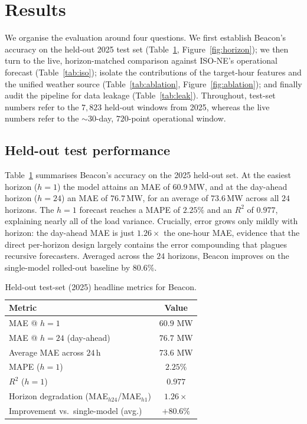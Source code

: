 \section{Results}\label{sec:results}

We organise the evaluation around four questions. We first
establish Beacon's accuracy on the held-out 2025 test set
(Table~\ref{tab:headline}, Figure~\ref{fig:horizon}); we then turn to the live,
horizon-matched comparison against ISO-NE's operational forecast
(Table~\ref{tab:iso}); isolate the contributions of the target-hour features and
the unified weather source (Table~\ref{tab:ablation}, Figure~\ref{fig:ablation});
and finally audit the pipeline for data leakage (Table~\ref{tab:leak}). Throughout,
test-set numbers refer to the $7{,}823$ held-out windows from 2025, whereas the
live numbers refer to the $\sim$30-day, $720$-point operational window.

\subsection{Held-out test performance}
Table~\ref{tab:headline} summarises Beacon's accuracy on the 2025 held-out set.
At the easiest horizon ($h=1$) the model attains an MAE of $60.9$\,MW, and at the
day-ahead horizon ($h=24$) an MAE of $76.7$\,MW, for an average of $73.6$\,MW
across all $24$ horizons. The $h=1$ forecast reaches a MAPE of $2.25\%$ and an
$R^2$ of $0.977$, explaining nearly all of the load variance. Crucially, error
grows only mildly with horizon: the day-ahead MAE is just $1.26\times$ the
one-hour MAE, evidence that the direct per-horizon design largely contains the
error compounding that plagues recursive forecasters. Averaged across the $24$
horizons, Beacon improves on the single-model rolled-out baseline by $80.6\%$.

\begin{table}[t]
\centering
\caption{Held-out test-set (2025) headline metrics for Beacon.}
\label{tab:headline}
\begin{tabular}{lc}
\toprule
Metric & Value \\
\midrule
MAE @ $h=1$ & $60.9$ MW \\
MAE @ $h=24$ (day-ahead) & $76.7$ MW \\
Average MAE across $24$\,h & $73.6$ MW \\
MAPE ($h=1$) & $2.25\%$ \\
$R^2$ ($h=1$) & $0.977$ \\
Horizon degradation (MAE$_{h24}$/MAE$_{h1}$) & $1.26\times$ \\
Improvement vs.\ single-model (avg.) & $+80.6\%$ \\
\bottomrule
\end{tabular}
\end{table}

